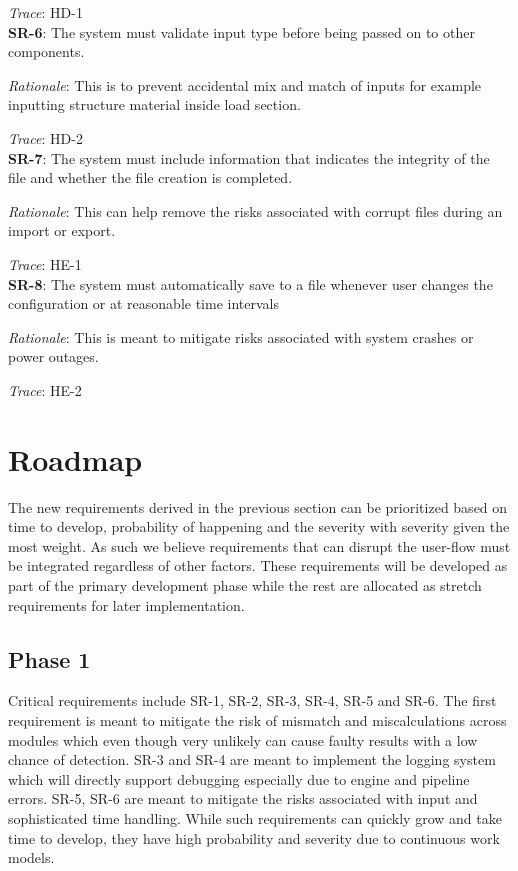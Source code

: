 \documentclass{article}
\begin{document}
\emph{Trace}: HD-1 \\

\textbf{SR-6}:
The system must validate input type before being passed on to other components.

\emph{Rationale}: This is to prevent accidental mix and match of inputs for example inputting structure material inside load section.

\emph{Trace}: HD-2\\

\textbf{SR-7}:
The system must include information that indicates the integrity of the file and whether the file creation is completed.

\emph{Rationale}: This can help remove the risks associated with corrupt files during an import or export. 

\emph{Trace}: HE-1\\

\textbf{SR-8}:
The system must automatically save to a file whenever user changes the configuration or at reasonable time intervals

\emph{Rationale}: This is meant to mitigate risks associated with system crashes or power outages.

\emph{Trace}: HE-2\\

\section{Roadmap}

The new requirements derived in the previous section can be prioritized based on time to develop, probability of happening and the severity with severity given the most weight. As such we believe requirements that can disrupt the user-flow must be integrated regardless of other factors. These requirements will be developed as part of the primary development phase while the rest are allocated as stretch requirements for later implementation. 

\subsection{Phase 1}
Critical requirements include SR-1, SR-2, SR-3, SR-4, SR-5 and SR-6. The first requirement is meant to mitigate the risk of mismatch and miscalculations across modules which even though very unlikely can cause faulty results with a low chance of detection. SR-3 and SR-4 are meant to implement the logging system which will directly support debugging especially due to engine and pipeline errors. SR-5, SR-6 are meant to mitigate the risks associated with input and sophisticated time handling. While such requirements can quickly grow and take time to develop, they have high probability and severity due to continuous work models. 
\end{document}
